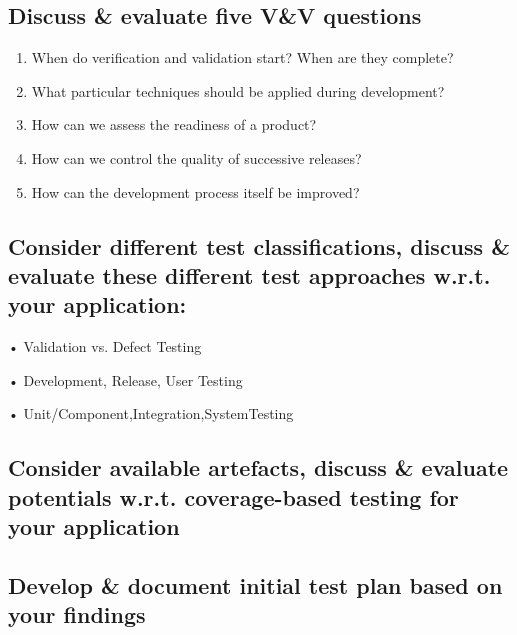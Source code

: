 \documentclass{scrartcl}
\begin{document}
\subsection*{Discuss \& evaluate five V\&V questions}
\begin{enumerate}
  \item When do verification and validation start? When are they complete?
  \item What particular techniques should be applied during development?
  \item How can we assess the readiness of a product?
  \item How can we control the quality of successive releases?
  \item How can the development process itself be improved?
\end{enumerate}
\subsection*{Consider different test classifications, discuss \& evaluate these different test approaches w.r.t. your application:}

• Validation vs. Defect Testing

• Development, Release, User Testing

• Unit/Component,Integration,SystemTesting

\subsection*{Consider available artefacts, discuss \& evaluate potentials w.r.t. coverage-based testing for your application}

\subsection*{Develop \& document initial test plan based on your findings}
\end{document}
